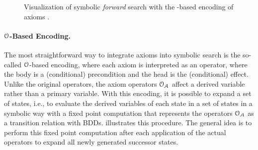 \begin{figure}
    \centering
    
    \caption[\operators{}-based encoding of axioms.]{Visualization of symbolic \emph{forward} search with the
        \operators{}-based encoding of axioms \autocite{speck-et-al-icaps2019}.\label{fig:axiom_option1}}
\end{figure}

%             
%             
%             

\paragraph{$\mathcal O$-Based Encoding.}
The most straightforward way to integrate axioms into symbolic search is the so-called $\mathcal O$-based encoding, where each axiom is interpreted as an operator, where the body is a (conditional) precondition and the head is the (conditional) effect.
Unlike the original operators, the axiom operators $\mathcal O_{\mathcal A}$ affect a derived variable rather than a primary variable.
With this encoding, it is possible to expand a set of states, i.e., to evaluate the derived variables of each state in a set of states in a symbolic way with a fixed point computation that represents the operators $\mathcal O_{\mathcal A}$ as a transition relation with BDDs.
 illustrates this procedure.
The general idea is to perform this fixed point computation after each application of the actual operators to expand all newly generated successor states.

